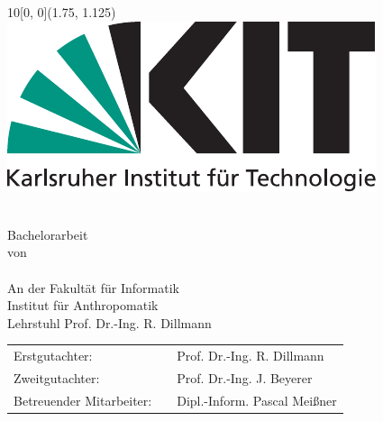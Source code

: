\newcommand{\diameter}{20}
\newcommand{\xone}{-55}
\newcommand{\xtwo}{450}
\newcommand{\yone}{75}
\newcommand{\ytwo}{-685}

\newcommand{\timestart}{24. Mai 2013}
\newcommand{\timeend}{23. September 2013}

\begin{titlepage}

  \begin{textblock}{10}[0, 0](1.75, 1.125)
    \includegraphics[width=.3\textwidth]{bilder/Kitlogo_de_rgb.pdf}
  \end{textblock}

  \vspace*{3.5cm}
  \begin{center}
    \huge{\mytitle}\\
    \vspace*{2cm}
    \large{Bachelorarbeit\\von}\\
    \vspace*{1cm}
    \LARGE{\myname}\\
    \vspace*{1cm}
    \large{An der Fakultät für Informatik\\Institut für Anthropomatik\\Lehrstuhl Prof. Dr.-Ing. R. Dillmann}
  \end{center}

  \vspace*{1cm}
  \large{
    \begin{center}
      \begin{tabular}[ht]{l c l}
        Erstgutachter: & \hfill  & Prof. Dr.-Ing. R. Dillmann\\
        Zweitgutachter: & \hfill  & Prof. Dr.-Ing. J. Beyerer\\
        Betreuender Mitarbeiter: & \hfill  & Dipl.-Inform. Pascal Meißner\\
      \end{tabular}
    \end{center}
  }


\end{titlepage}
